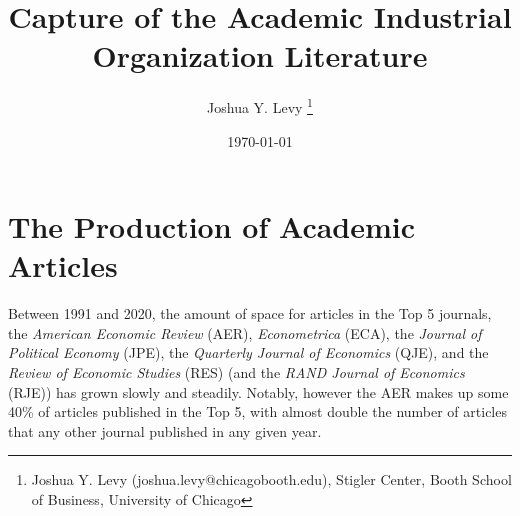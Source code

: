 \documentclass[11pt, letterpaper, twoside]{article}
\title{\singlespacing\textbf{Capture of the Academic Industrial Organization Literature}}
\author{ 
    Joshua Y. Levy \thanks{Joshua Y. Levy  (joshua.levy@chicagobooth.edu), Stigler Center, Booth School of Business, University of Chicago}}
\date{\today}
\begin{document}
\begin{titlepage}
    \maketitle
    \thispagestyle{empty}
\end{titlepage}


\newpage
{}


\section{The Production of Academic Articles}
Between 1991 and 2020, the amount of space for articles in the Top 5 journals, the \textit{American Economic Review} (AER), \textit{Econometrica} (ECA), the \textit{Journal of Political Economy} (JPE), the \textit{Quarterly Journal of Economics} (QJE), and the \textit{Review of Economic Studies} (RES) (and the \textit{RAND Journal of Economics} (RJE)) has grown slowly and steadily. Notably, however the AER makes up some 40\% of articles published in the Top 5, with almost double the number of articles that any other journal published in any given year.\\
\end{document}
